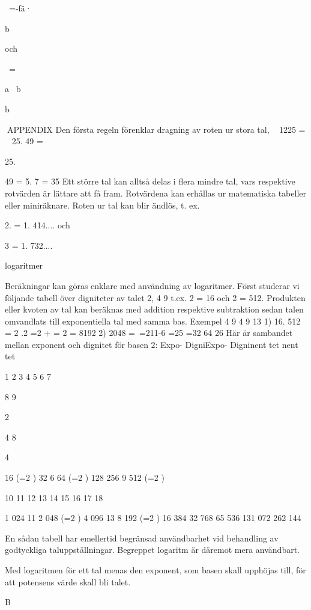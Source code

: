 ~=-fä·{b

och

~={a
~b {b

APPENDIX
Den första regeln förenklar dragning av roten ur stora tal,
~ 1225 = ~ 25. 49 = {25. {49 = 5. 7 = 35
Ett större tal kan alltså delas i flera mindre tal,
vars respektive rotvärden är lättare att få
fram. Rotvärdena kan erhållas ur matematiska tabeller eller miniräknare.
Roten ur tal kan blir ändlös, t. ex.
{2. = 1. 414.... och {3 = 1. 732....

logaritmer

Beräkningar kan göras enklare med användning av logaritmer.
Först studerar vi följande tabell över digniteter av talet 2,
4
9
t.ex. 2 = 16 och 2 = 512.
Produkten eller kvoten av tal kan beräknas
med addition respektive subtraktion sedan
talen omvandlats till exponentiella tal med
samma bas.
Exempel
4
9
4 9
13
1) 16. 512 = 2 .2 =2 + = 2 = 8192
2) 2048 =~=211-6 =25 =32
64
26
Här är sambandet mellan exponent och dignitet för basen 2:
Expo- DigniExpo- Digninent
tet
nent
tet

1
2
3
4
5
6
7

8
9

2

4
8

4

16 (=2 )
32
6
64 (=2 )
128
256
9
512 (=2 )

10
11
12
13
14
15
16
17
18

1 024
11
2 048 (=2 )
4 096
13
8 192 (=2 )
16 384
32 768
65 536
131 072
262 144

En sådan tabell har emellertid begränsad
användbarhet vid behandling av godtyckliga
taluppställningar. Begreppet logaritm är däremot mera användbart.

Med logaritmen för ett tal menas den
exponent, som basen skall upphöjas till,
för att potensens värde skall bli talet.

B

}}}}}}}
